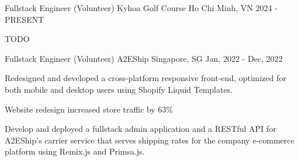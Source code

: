\begin{cventries}
  \cventry
  {Fullstack Engineer (Volunteer)} %
  {Kyhoa Golf Course} %
  {Ho Chi Minh, VN}
  {2024 - PRESENT}
  {
    \begin{cvitems} %
    \item TODO
    \end{cvitems}
  }
  
  \cventry
  {Fullstack Engineer (Volunteer)} %
  {A2EShip} %
  {Singapore, SG}
  {Jan, 2022 - Dec, 2022}
  {
    \begin{cvitems} %
      \item Redesigned and developed a cross-platform responsive front-end,
      optimized for both mobile and desktop users using Shopify Liquid Templates.
      \item Website redesign increased store traffic by 63\%
      \item Develop and deployed a fullstack admin application and a RESTful API for A2EShip's carrier service 
        that serves shipping rates for the company e-commerce platform using Remix.js and Primsa.js.
    \end{cvitems}
  }
\end{cventries}
